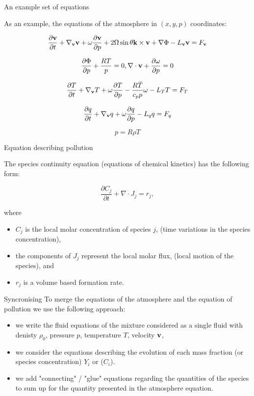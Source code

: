 \documentclass{beamer}
\begin{document}
\begin{frame}{An example set of equations}

As an example, the equations of the atmosphere in $(x, y, p)$ coordinates:

\[ \frac{\partial \bold{v}}{\partial t} + \nabla_{\bold{v}}\bold{v} + \omega \frac{\partial \bold{v}}{\partial p} + 2 \Omega \sin \theta \bold{k} \times \bold{v} + \nabla \Phi -L_{\bold{v}} \bold{v} = F_\bold{v}  \]

\[ \frac{\partial \Phi}{\partial p} + \frac{RT}{p} = 0, \nabla \cdot \bold{v} + \frac{\partial \omega}{\partial p} = 0 \]

\[ \frac{\partial T}{\partial t} + \nabla_{\bold{v}} T + \omega \frac{\partial T}{\partial p} - \frac{R \bar{T}}{c_p p} \omega - L_T T = F_T\]

\[ \frac{\partial q}{\partial t} + \nabla_{\bold{v}}q + \omega \frac{\partial q}{\partial p} -L_q q = F_q \]

\[ p = R \rho T\]

\end{frame}

\begin{frame}{Equation describing pollution}

The species continuity equation (equations of chemical kinetics) has the following form:

\[ \frac{\partial C_j}{\partial t} + \nabla \cdot J_j = r_j,\]

where

\begin{itemize}
\item $C_j$ is the local molar concentration of species $j$, (time variations in the species concentration),
\item the components of $J_j$ represent the local molar flux, (local motion of the species), and
\item $r_j$ is a volume based formation rate.
\end{itemize}

\end{frame}

\begin{frame}{Syncronising}
To merge the equations of the atmosphere and the equation of pollution we use the following approach:
\begin{itemize}
\item we write the fluid equations of the mixture considered as a single fluid with denisty $\rho_0$, pressure $p$, temperature $T$, velocity $\bold{v}$,
\item we consider the equations describing the evolution of each mass fraction (or species concentration) $Y_i$ or ($C_i$). 
\item we add "connecting" / "glue" equations regarding the quantities of the species to sum up for the quantity presented in the atmosphere equation.
\end{itemize}
\end{frame}
\end{document}
